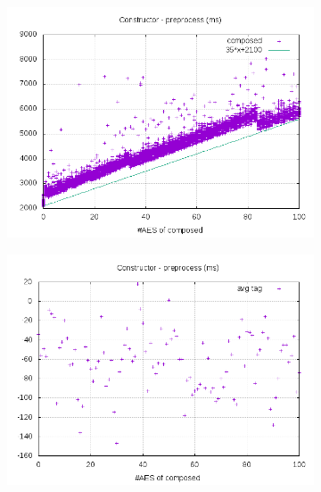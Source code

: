 \documentclass[10pt,a4paper]{article}
\begin{document}
\begin{figure}[h]
    \centering
    \begin{subfigure}[t]{0.3\textwidth}
        \includegraphics[width=\textwidth]{const_preprocess_plots}
        \caption{}
    \end{subfigure}
    \begin{subfigure}[t]{0.3\textwidth}
        \includegraphics[width=\textwidth]{const_preprocess_avg}
        \caption{}
    \end{subfigure}
    \begin{subfigure}[t]{0.3\textwidth}

\end{subfigure}
\end{figure}
\end{document}
